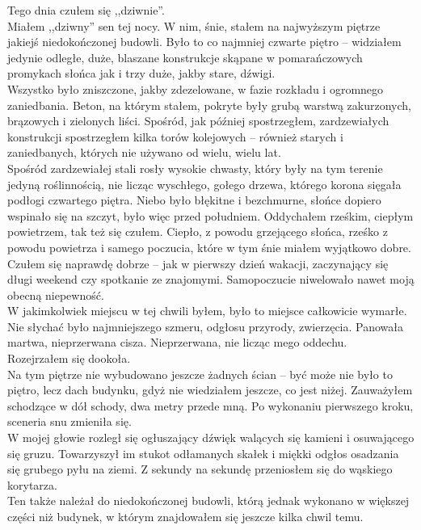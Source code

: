 \documentclass[../MAIN.tex]{subfiles}
\begin{document}
\qd
% 
% 
% 
Tego dnia czułem się ,,dziwnie''.\\
Miałem ,,dziwny'' sen tej nocy. W nim, śnie, stałem na najwyższym piętrze jakiejś niedokończonej budowli. Było to co najmniej czwarte piętro -- widziałem jedynie odległe, duże, blaszane konstrukcje skąpane w pomarańczowych promykach słońca jak i trzy duże, jakby stare, dźwigi.\\
Wszystko było zniszczone, jakby zdezelowane, w fazie rozkładu i ogromnego zaniedbania. Beton, na którym stałem, pokryte były grubą warstwą zakurzonych, brązowych i zielonych liści. Spośród, jak później spostrzegłem, zardzewiałych konstrukcji spostrzegłem kilka torów kolejowych -- również starych i zaniedbanych, których nie używano od wielu, wielu lat.\\
Spośród zardzewiałej stali rosły wysokie chwasty, który były na tym terenie jedyną roślinnością, nie licząc wyschłego, gołego drzewa, którego korona sięgała podłogi czwartego piętra.
Niebo było błękitne i bezchmurne, słońce dopiero wspinało się na szczyt, było więc przed południem. Oddychałem rześkim, ciepłym powietrzem, tak też się czułem. Ciepło, z powodu grzejącego słońca, rześko z powodu powietrza i samego poczucia, które w tym śnie miałem wyjątkowo dobre. Czułem się naprawdę dobrze -- jak w pierwszy dzień wakacji, zaczynający się długi weekend czy spotkanie ze znajomymi. Samopoczucie niwelowało nawet moją obecną niepewność.\\
W jakimkolwiek miejscu w tej chwili byłem, było to miejsce całkowicie wymarłe. Nie słychać było najmniejszego szmeru, odgłosu przyrody, zwierzęcia. Panowała martwa, nieprzerwana cisza. Nieprzerwana, nie licząc mego oddechu.\\
Rozejrzałem się dookoła.\\
Na tym piętrze nie wybudowano jeszcze żadnych ścian -- być może nie było to piętro, lecz dach budynku, gdyż nie wiedziałem jeszcze, co jest niżej. Zauważyłem schodzące w dół schody, dwa metry przede mną. Po wykonaniu pierwszego kroku, sceneria snu zmieniła się.\\
W mojej głowie rozległ się ogłuszający dźwięk walących się kamieni i osuwającego się gruzu. Towarzyszył im stukot odłamanych skałek i miękki odgłos osadzania się grubego pyłu na ziemi. Z sekundy na sekundę przeniosłem się do wąskiego korytarza.\\
Ten także należał do niedokończonej budowli, którą jednak wykonano w większej części niż budynek, w którym znajdowałem się jeszcze kilka chwil temu.\\
\end{document}
